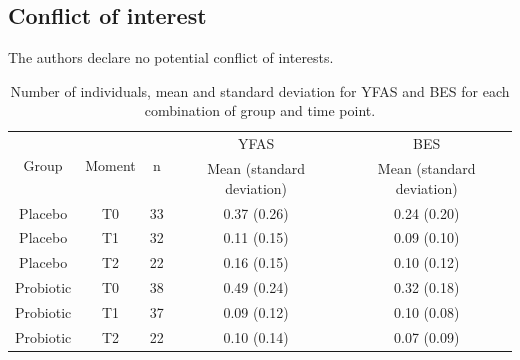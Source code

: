 \documentclass[AMA,STIX1COL]{WileyNJD-v2}
\begin{document}

\subsection*{Conflict of interest}

The authors declare no potential conflict of interests.






%

\clearpage


\begin{table}[H]
\centering
\begin{tabular}{ccccc}
\hline
\multirow{2}{*}{Group} & \multirow{2}{*}{Moment}  & \multirow{2}{*}{n} & YFAS                  & BES                   \\ \cline{4-5} 
                       &                          &                    & Mean (standard deviation) & Mean (standard deviation) \\ \hline
Placebo                & T0                       & 33                 & 0.37 (0.26)           & 0.24 (0.20)           \\
Placebo                & T1                       & 32                 & 0.11 (0.15)           & 0.09 (0.10)           \\
Placebo                & T2                       & 22                 & 0.16 (0.15)           & 0.10 (0.12)           \\
Probiotic              & T0                       & 38                 & 0.49 (0.24)           & 0.32 (0.18)           \\
Probiotic              & T1                       & 37                 & 0.09 (0.12)           & 0.10 (0.08)           \\
Probiotic              & T2                       & 22                 & 0.10 (0.14)           & 0.07 (0.09)           \\ \hline
\end{tabular}
\caption{Number of individuals, mean and standard deviation for YFAS and BES for each combination of group and time point.}
\label{tab:tab1}
\end{table}
\end{document}
